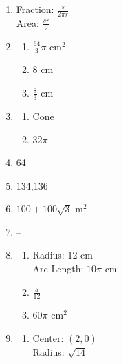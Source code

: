 \documentclass{article}
\begin{document}
\begin{enumerate}
\item Fraction: $\frac{s}{2\pi r}$ \\
	Area: $\frac{sr}{2}$
	
\item

	\begin{enumerate}
	
	\item $\frac{64}{3} \pi$ cm$^2$
	
	\item 8 cm
	
	\item $\frac{8}{3}$ cm
	
	\end{enumerate}
	
\item

	\begin{enumerate}
	
	\item Cone
	
	\item $32\pi$
	
	\end{enumerate}
	
\item 64

\item 134,136

\item $100 + 100\sqrt{3}$ m$^2$

\item --

\item

	\begin{enumerate}
	
	\item Radius: 12 cm \\
		Arc Length: $10\pi$ cm
	
	\item $\frac{5}{12}$
	
	\item $60\pi$ cm$^2$
	
	\end{enumerate}
	
\item

	\begin{enumerate}
	
	\item Center: $(2, 0)$ \\
		Radius: $\sqrt{14}$
		

\end{enumerate}
\end{enumerate}
\end{document}
